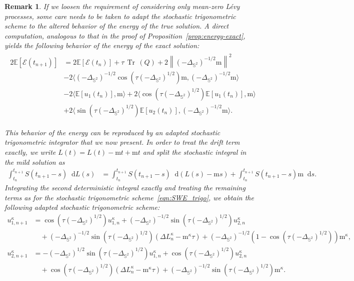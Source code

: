 \documentclass[11pt]{amsart}
\newtheorem{remark}[theorem]{Remark}
\newcommand{\E}{{\mathbb E}}
\newcommand{\IS}{\mathbb{S}}
\newcommand{\tr}{{\operatorname{Tr}\, }}
\newcommand{\cE}{\mathcal E}
\providecommand{\norm}[1]{\left\lVert#1\right\rVert}
\newcommand*\dd{\mathop{}\!\mathrm{d}}
\newcommand{\mean}{\mathrm{m}}
\newcommand{\Deltalb}{\Delta_{\IS^2}}
\begin{document}
\begin{remark}
  If we loosen the requirement of considering only mean-zero L\'evy processes, some care needs to be taken to adapt the stochastic trigonometric scheme to the altered behavior of the energy of the true solution. A direct computation, analogous to that in the proof of Proposition~\ref{prop:energy-exact}, yields the following behavior of the energy of the exact solution:
\allowdisplaybreaks
\begin{align}
    \begin{split}
    \label{eqn:swe_energy_nonzero_mean}
    2 \E\left[\cE(t_{n+1})\right]
    & = 2\E\left[\cE(t_n)\right] + \tau\, \tr(Q) + 2 \norm{(-\Deltalb)^{-1/2}\mean }^2 \\
    & - 2\langle {(-\Deltalb)^{-1/2}}\cos(\tau(-\Deltalb)^{1/2})\mean , {(-\Deltalb)^{-1/2}}\mean  \rangle\\
    & - 2 \langle \E\left[{u_1(t_n)}\right], \mean  \rangle
    + 2 \langle \cos(\tau(-\Deltalb)^{1/2})\E\left[{u_1(t_n)}\right], \mean \rangle \\
    & + 2 \langle \sin(\tau(-\Deltalb)^{1/2})\E\left[{u_2(t_n)}\right], {(-\Deltalb)^{-1/2}}\mean \rangle.
    \end{split}
\end{align}

This behavior of the energy can be reproduced by an adapted stochastic trigonometric integrator that we now present.
In order to treat the drift term exactly, we write  $L(t) = L(t) - \mean t + \mean t$ and split the stochastic integral in the mild solution as
\begin{align*}
    \int_{t_n}^{t_{n+1}}S(t_{n+1}-s)\dd L(s) &= \int_{t_n}^{t_{n+1}}S(t_{n+1}-s)\dd(L(s) - \mean s)
    + \int_{t_n}^{t_{n+1}}S(t_{n+1}-s) \mean \dd s.
\end{align*}
Integrating the second deterministic integral exactly and treating the remaining terms as for the
stochastic trigonometric scheme~\eqref{eqn:SWE_trigo}, we obtain the following adapted stochastic trigonometric scheme:
\begin{align*}
    u_{1,n+1}^\kappa&=\cos(\tau(-\Deltalb)^{1/2})u_{1,n}^\kappa
    +(-\Deltalb)^{-1/2}\sin(\tau(-\Deltalb)^{1/2})u_{2,n}^\kappa\\
    & \quad+(-\Deltalb)^{-1/2}\sin(\tau(-\Deltalb)^{1/2})(\Delta L^\kappa_n - \mean^\kappa\tau)
     + (-\Deltalb)^{-1/2}\left(1 - \cos(\tau(-\Deltalb)^{1/2})\right)\mean^\kappa,\\
    u_{2,n+1}^\kappa&=-(-\Deltalb)^{1/2}\sin(\tau(-\Deltalb)^{1/2})u_{1,n}^\kappa
    +\cos(\tau(-\Deltalb)^{1/2})u_{2,n}^\kappa\\
    & \quad+\cos(\tau(-\Deltalb)^{1/2})(\Delta L^\kappa_n - \mean^\kappa\tau)
     + (-\Deltalb)^{-1/2}\sin(\tau(-\Deltalb)^{1/2})\mean^\kappa.
\end{align*}


\end{remark}
\end{document}
